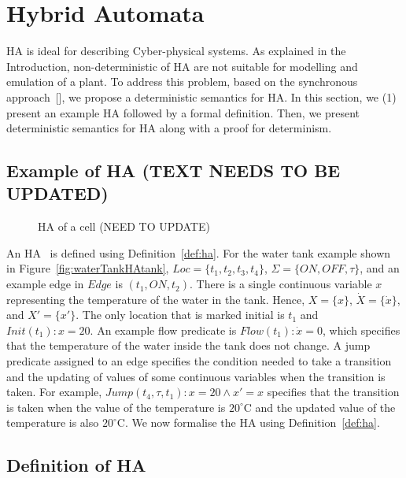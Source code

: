 \section{Hybrid Automata}
\label{sec:HA}



\acf{HA} is ideal for describing 
Cyber-physical systems. As explained in the Introduction,
non-deterministic of \ac{HA} are not suitable for modelling and
emulation of a plant. To address this problem, based on the
synchronous approach~[], we propose a deterministic semantics for \ac{HA}.
In this section, we (1) present an example \ac{HA} 
followed by a formal definition.
Then, we present deterministic semantics for \ac{HA} 
along with a proof for determinism.



\subsection{Example of \ac{HA} (TEXT NEEDS TO BE UPDATED)}

\begin{figure}
	

\caption{\acf{HA} of a cell (NEED TO UPDATE)}
\end{figure}

An HA~\cite{lynch03} is defined using Definition~\ref{def:ha}. For the
water tank example shown in Figure~\ref{fig:waterTankHAtank},
$Loc=\{t_1, t_2, t_3, t_4\}$, $\Sigma=\{ON, OFF, \tau\}$, and an example
edge in $Edge$ is $(t_1, ON, t_2)$. There is a single continuous
variable $x$ representing the temperature of the water in the
tank. Hence, $X=\{x\}$, $\dot{X}=\{\dot{x}\}$, and $X'=\{x'\}$. The only
location that is marked initial is $t_1$ and $Init(t_1): x=20$. An
example flow predicate is $Flow(t_1): \dot{x}=0$, which specifies that
the temperature of the water inside the tank does not change.  A jump
predicate assigned to an edge specifies the condition needed to take a
transition and the updating of values of some continuous variables when
the transition is taken.  For example,
$Jump(t_4, \tau, t_1): x=20 \wedge x'=x$ specifies that the transition
is taken when the value of the temperature is $20^\circ$C and the
updated value of the temperature is also $20^\circ$C. We now formalise
the HA using Definition~\ref{def:ha}.

\subsection{Definition of \ac{HA}}


